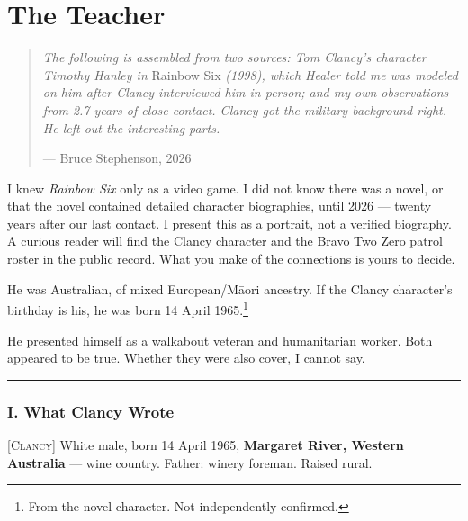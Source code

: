 

\chapter*{The Teacher}
\label{record:handler}

\begin{quote}\small
\textit{The following is assembled from two sources: Tom Clancy's character Timothy Hanley in} Rainbow Six \textit{(1998), which Healer told me was modeled on him after Clancy interviewed him in person; and my own observations from 2.7 years of close contact. Clancy got the military background right. He left out the interesting parts.}
\par\raggedleft --- Bruce Stephenson, 2026\end{quote}

I knew \textit{Rainbow Six} only as a video game. I did not know there was a novel, or that the novel contained detailed character biographies, until 2026 --- twenty years after our last contact. I present this as a portrait, not a verified biography. A curious reader will find the Clancy character and the Bravo Two Zero patrol roster in the public record. What you make of the connections is yours to decide.

\noindent He was Australian, of mixed European/M\={a}ori ancestry. If the Clancy character's birthday is his, he was born 14 April 1965.\footnote{From the novel character. Not independently confirmed.}

He presented himself as a walkabout veteran and humanitarian worker. Both appeared to be true. Whether they were also cover, I cannot say.

\vspace{1cm}\hrule\vspace{1cm}

\subsection*{I. What Clancy Wrote}
\label{record:hd-biographical-summary-per-clancy}

\textsc{[Clancy]} White male, born 14 April 1965, \textbf{Margaret River, Western Australia} --- wine country. Father: winery foreman. Raised rural.

